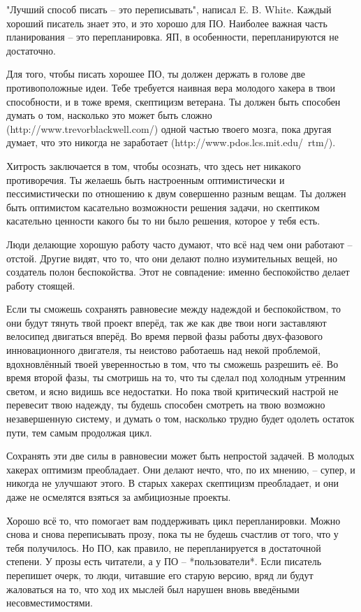 \documentclass[ebook,12pt,oneside,openany]{memoir}
\begin{document}
"Лучший способ писать -- это переписывать", написал E. B. White.
Каждый хороший писатель знает это, и это хорошо для ПО. Наиболее
важная часть планирования -- это перепланировка. ЯП, в особенности,
перепланируются не достаточно.

Для того, чтобы писать хорошее ПО, ты должен держать в голове две
противоположные идеи. Тебе требуется наивная вера молодого хакера в
твои способности, и в тоже время, скептицизм ветерана. Ты должен быть
способен думать о том, насколько это может быть сложно
(http://www.trevorblackwell.com/) одной частью твоего мозга, пока
другая думает, что это никогда не заработает
(http://www.pdos.lcs.mit.edu/~rtm/).

Хитрость заключается в том, чтобы осознать, что здесь нет никакого
противоречия. Ты желаешь быть настроенным оптимистически и
пессимистически по отношению к двум совершенно разным вещам. Ты должен
быть оптимистом касательно возможности решения задачи, но скептиком
касательно ценности какого бы то ни было решения, которое у тебя есть.

Люди делающие хорошую работу часто думают, что всё над чем они
работают -- отстой. Другие видят, что то, что они делают полно
изумительных вещей, но создатель полон беспокойства. Этот не
совпадение: именно беспокойство делает работу стоящей.

Если ты сможешь сохранять равновесие между надеждой и беспокойством,
то они будут тянуть твой проект вперёд, так же как две твои ноги
заставляют велосипед двигаться вперёд. Во время первой фазы работы
двух-фазового инновационного двигателя, ты неистово работаешь над
некой проблемой, вдохновлённый твоей уверенностью в том, что ты
сможешь разрешить её. Во время второй фазы, ты смотришь на то, что ты
сделал под холодным утренним светом, и ясно видишь все недостатки. Но
пока твой критический настрой не перевесит твою надежду, ты будешь
способен смотреть на твою возможно незавершенную систему, и думать о
том, насколько трудно будет одолеть остаток пути, тем самым продолжая
цикл.

Сохранять эти две силы в равновесии может быть непростой задачей. В
молодых хакерах оптимизм преобладает. Они делают нечто, что, по их
мнению, -- супер, и никогда не улучшают этого. В старых хакерах
скептицизм преобладает, и они даже не осмелятся взяться за амбициозные
проекты.

Хорошо всё то, что помогает вам поддерживать цикл перепланировки.
Можно снова и снова переписывать прозу, пока ты не будешь счастлив от
того, что у тебя получилось. Но ПО, как правило, не перепланируется в
достаточной степени. У прозы есть читатели, а у ПО -- *пользователи*.
Если писатель перепишет очерк, то люди, читавшие его старую версию,
вряд ли будут жаловаться на то, что ход их мыслей был нарушен вновь
введёными несовместимостями.
\end{document}
